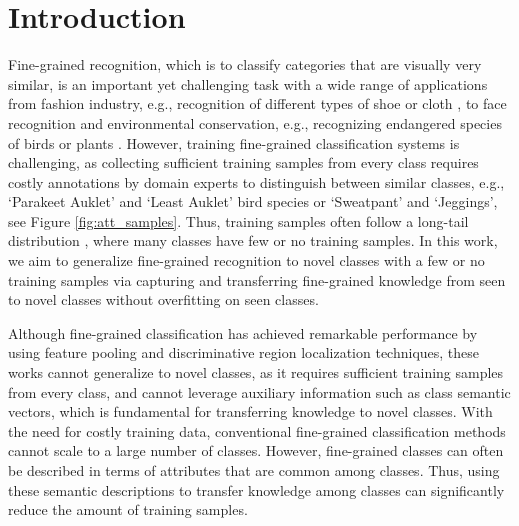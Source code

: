 \documentclass[10pt,journal,compsoc]{IEEEtran}
\newcommand{\1}{\boldsymbol{1}}
\newcommand{\0}{\boldsymbol{0}}
\newcommand{\<}{\langle}
\renewcommand{\>}{\rangle}
\begin{document}
\IEEEdisplaynontitleabstractindextext




\IEEEpeerreviewmaketitle








\section{Introduction}
Fine-grained recognition, which is to classify categories that are visually very similar, is an important yet challenging task with a wide range of applications from fashion industry, e.g., recognition of different types of shoe or cloth \cite{Wang:CVPR18,Liu:CVPR16,Ak:CVPR18}, to face recognition \cite{Parkhi:BMVC15,Wen:ECCV16,Liu:ICCV15} and environmental conservation, e.g., recognizing endangered species of birds or plants \cite{Ding:ICCV19,elhoseiny:CVPR17,Lin:ICCV15,Zheng:ICCV17,Zhao:ICCV19,Zhang:CVPR16}. However, training fine-grained classification systems is challenging, as collecting sufficient training samples from every class requires costly annotations by domain experts to distinguish between similar classes, e.g., `Parakeet Auklet' and `Least Auklet' bird species or `Sweatpant' and `Jeggings', see Figure \ref{fig:att_samples}. Thus, training samples often follow a long-tail distribution \cite{Huynh-mll:CVPR20,Wertheimer:CVPR19}, where many classes have few or no training samples. In this work, we aim to generalize fine-grained recognition to novel classes with a few or no training samples via capturing and transferring fine-grained knowledge from seen to novel classes without overfitting on seen classes.


Although fine-grained classification has achieved remarkable performance by using feature pooling \cite{Kong:CVPR17,Gao:CVPR16,Lin:ICCV15} and discriminative region localization \cite{Zhao:ICCV19,Ding:ICCV19,Ak:CVPR18,Wang:CVPR18,Zhang:CVPR16,Liu:CVPR16} techniques, these works cannot generalize to novel classes, as it requires sufficient training samples from every class, and cannot leverage auxiliary information such as class semantic vectors, which is fundamental for transferring knowledge to novel classes. With the need for costly training data, conventional fine-grained classification methods cannot scale to a large number of classes. However, fine-grained classes can often be described in terms of attributes that are common among classes. Thus, using these semantic descriptions to transfer knowledge among classes can significantly reduce the amount of training samples.
\end{document}

